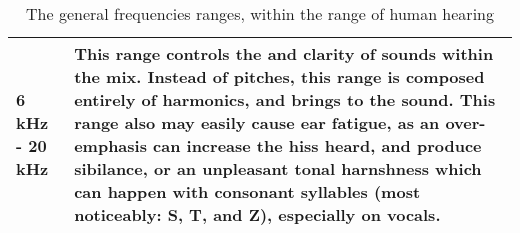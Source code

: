 \begin{table}
\begin{tabular}{|p{20em}  p{25em}|}
		\hline
		6 kHz - 20 kHz & This range controls the \say{brilliance} and clarity of sounds within the mix. Instead of pitches, this range is composed entirely of harmonics, and brings \say{sparkle} to the sound. This range also may easily cause ear fatigue, as an over-emphasis can increase the hiss heard, and produce sibilance, or an unpleasant tonal harnshness which can happen with consonant syllables (most noticeably: S, T, and Z), especially on vocals. \\
		\hline
	\end{tabular}
\caption{The general frequencies ranges, within the range of human hearing}\cite{Suits_1998}\cite{Zjalic_2021}
\label{tbl:frequency-table-of-human-hearing-general}
\end{table}